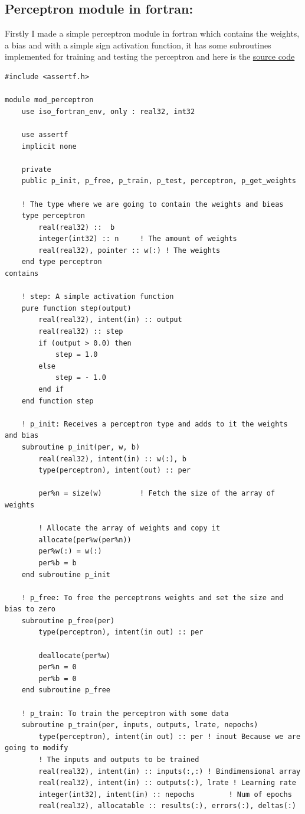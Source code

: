 \documentclass[12pt]{article}
\begin{document}
\subsection{Perceptron module in fortran:}
Firstly I made a simple perceptron module in fortran which contains the weights, a bias and with a
simple sign activation function, it has some subroutines implemented for training and testing the
perceptron and here is the
\href{https://github.com/alecksandr26/machine-learning-code/blob/main/src/mod_perceptron.f90}{source
  code}

\begin{lstlisting}
#include <assertf.h>

module mod_perceptron
    use iso_fortran_env, only : real32, int32
 
    use assertf
    implicit none

    private
    public p_init, p_free, p_train, p_test, perceptron, p_get_weights

    ! The type where we are going to contain the weights and bieas
    type perceptron
        real(real32) ::  b
        integer(int32) :: n     ! The amount of weights
        real(real32), pointer :: w(:) ! The weights
    end type perceptron
contains
    
    ! step: A simple activation function
    pure function step(output)
        real(real32), intent(in) :: output
        real(real32) :: step
        if (output > 0.0) then
            step = 1.0
        else
            step = - 1.0
        end if
    end function step
    
    ! p_init: Receives a perceptron type and adds to it the weights and bias
    subroutine p_init(per, w, b)
        real(real32), intent(in) :: w(:), b
        type(perceptron), intent(out) :: per

        per%n = size(w)         ! Fetch the size of the array of weights
        
        ! Allocate the array of weights and copy it
        allocate(per%w(per%n))
        per%w(:) = w(:)
        per%b = b
    end subroutine p_init

    ! p_free: To free the perceptrons weights and set the size and bias to zero
    subroutine p_free(per)
        type(perceptron), intent(in out) :: per
        
        deallocate(per%w)
        per%n = 0
        per%b = 0
    end subroutine p_free
        
    ! p_train: To train the perceptron with some data
    subroutine p_train(per, inputs, outputs, lrate, nepochs)
        type(perceptron), intent(in out) :: per ! inout Because we are going to modify
        ! The inputs and outputs to be trained
        real(real32), intent(in) :: inputs(:,:) ! Bindimensional array
        real(real32), intent(in) :: outputs(:), lrate ! Learning rate
        integer(int32), intent(in) :: nepochs        ! Num of epochs
        real(real32), allocatable :: results(:), errors(:), deltas(:)


\end{lstlisting}
\end{document}
